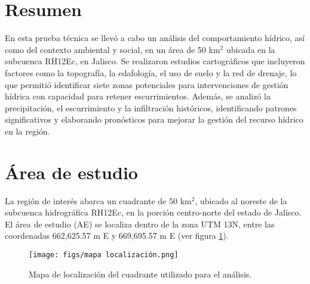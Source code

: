 \documentclass[12pt,letterpaper]{article}
\begin{document}
\thispagestyle{empty}


\newpage

\section{Resumen}

En esta prueba técnica se llevó a cabo un análisis del comportamiento hídrico, así como del contexto ambiental y social, en un área de 50 km$^2$ ubicada en la subcuenca RH12Ec, en Jalisco. Se realizaron estudios cartográficos que incluyeron factores como la topografía, la edafología, el uso de suelo y la red de drenaje, lo que permitió identificar siete zonas potenciales para intervenciones de gestión hídrica con capacidad para retener escurrimientos. Además, se analizó la precipitación, el escurrimiento y la infiltración históricos, identificando patrones significativos y elaborando pronósticos para mejorar la gestión del recurso hídrico en la región.

\section{Área de estudio}

La región de interés abarca un cuadrante de 50 km$^2$, ubicado al noreste de la subcuenca hidrográfica RH12Ec, en la porción centro-norte del estado de Jalisco. El área de estudio (AE) se localiza dentro de la zona UTM 13N, entre las coordenadas 662,625.57 m E y 669,695.57 m E (ver figura \ref{fig:loc}).

\begin{figure}[h!]
    \centering
    \texttt{[image: figs/mapa localización.png]}
    \caption{Mapa de localización del cuadrante utilizado para el análisis.}
    \label{fig:loc}
\end{figure}
\end{document}
